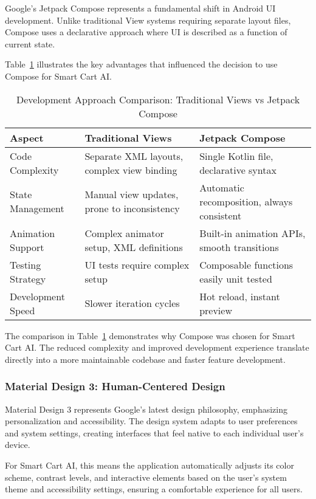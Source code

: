 \documentclass[11pt,a4paper]{article}
\begin{document}
Google's Jetpack Compose represents a fundamental shift in Android UI development. Unlike traditional View systems requiring separate layout files, Compose uses a declarative approach where UI is described as a function of current state.

Table~\ref{tab:compose_comparison} illustrates the key advantages that influenced the decision to use Compose for Smart Cart AI.

\begin{table}[H]
\centering
\caption{Development Approach Comparison: Traditional Views vs Jetpack Compose}
\label{tab:compose_comparison}
\begin{tabular}{@{}p{3cm}p{4cm}p{4cm}@{}}
\toprule
\textbf{Aspect} & \textbf{Traditional Views} & \textbf{Jetpack Compose} \\
\midrule
Code Complexity & Separate XML layouts, complex view binding & Single Kotlin file, declarative syntax \\
State Management & Manual view updates, prone to inconsistency & Automatic recomposition, always consistent \\
Animation Support & Complex animator setup, XML definitions & Built-in animation APIs, smooth transitions \\
Testing Strategy & UI tests require complex setup & Composable functions easily unit tested \\
Development Speed & Slower iteration cycles & Hot reload, instant preview \\
\bottomrule
\end{tabular}
\end{table}

The comparison in Table~\ref{tab:compose_comparison} demonstrates why Compose was chosen for Smart Cart AI. The reduced complexity and improved development experience translate directly into a more maintainable codebase and faster feature development.

\subsubsection{Material Design 3: Human-Centered Design}

Material Design 3 represents Google's latest design philosophy, emphasizing personalization and accessibility. The design system adapts to user preferences and system settings, creating interfaces that feel native to each individual user's device.

For Smart Cart AI, this means the application automatically adjusts its color scheme, contrast levels, and interactive elements based on the user's system theme and accessibility settings, ensuring a comfortable experience for all users.
\end{document}
